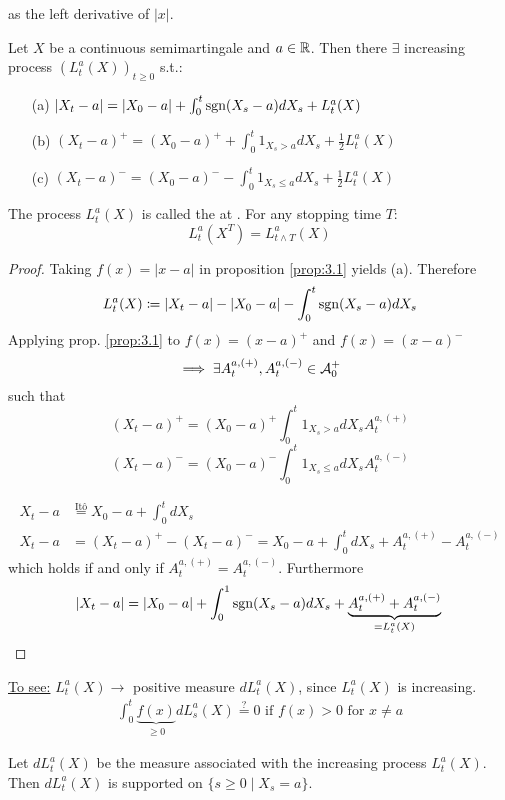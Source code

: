 as the left derivative of $|x|$.

\begin{proposition}\label{Tanaka's formula}
    Let $X$ be a continuous semimartingale and $a\in\mathbb{R}$. Then there $\exists$ increasing process 
    $(L_t^a(X))_{t\geq 0}$ s.t.:
    \begin{enumerate}
        \item[(a)] $|X_t-a|=|X_0-a|+\int_{0}^t\text{sgn}(X_s-a)dX_s+L_t^a(X)$
        \item[(b)] $(X_t-a)^+ = (X_0-a)^++\int_0^t 1_{X_s>a}dX_s+\frac{1}{2}L_t^a(X)$
        \item[(c)] $(X_t-a)^- = (X_0-a)^--\int_0^t 1_{X_s\leq a}dX_s+\frac{1}{2}L_t^a(X)$
    \end{enumerate}
    The process $L_t^a(X)$ is called the  at .
    For any stopping time $T$:\[L_t^a(X^T)=L_{t\land T}^a(X)\]
\end{proposition}

\begin{proof}
    Taking $f(x)=|x-a|$ in proposition \ref{prop:3.1} yields (a). Therefore 
    \[L_t^a(X)\coloneqq |X_t-a|-|X_0-a|-\int_0^t\text{sgn}(X_s-a)dX_s\]
    Applying prop. \ref{prop:3.1} to $f(x)=(x-a)^+$ and $f(x)=(x-a)^-$
    \[\implies \exists A_t^{a,(+)},A_t^{a,(-)}\in \mathcal{A}_0^+\]
    such that 
    \[(X_t-a)^+=(X_0-a)^+\int_0^t 1_{X_s>a}dX_s A_t^{a,(+)}\]
    \[(X_t-a)^-=(X_0-a)^-\int_0^t 1_{X_s\leq a}dX_s A_t^{a,(-)}\]

    \begin{align*}
        X_t-a&\stackrel{\text{Itô}}{=}X_0-a+\int_0^tdX_s\\
        X_t-a&=(X_t-a)^+-(X_t-a)^-=X_0-a+\int_0^t dX_s + A_t^{a,(+)}- A_t^{a,(-)}
    \end{align*}
    which holds if and only if $ A_t^{a,(+)}= A_t^{a,(-)}$.
    Furthermore 
    \[|X_t-a|=|X_0-a|+\int_0^1\text{sgn}(X_s-a)dX_s+ \underbrace{A_t^{a,(+)}+ A_t^{a,(-)}}_{=L_t^a(X)}\qedhere\]

\end{proof}

\underline{To see:} $L_t^a(X)\to$ positive measure $dL_t^a(X)$, since $L_t^a(X)$ is increasing.
\begin{align*}
    \int_0^t \underbrace{f(x)}_{\geq 0}dL_s^a(X)\stackrel{\text{?}}{=}0\text{ if } f(x)>0\text{ for } x\neq a
\end{align*}   

\begin{proposition}\label{prop:3.3}
    Let $dL_t^a(X)$ be the measure associated with the increasing process $L_t^a(X)$.
    Then $dL_t^a(X)$ is supported on $\{s\geq 0\mid X_s=a\}$.
\end{proposition}

